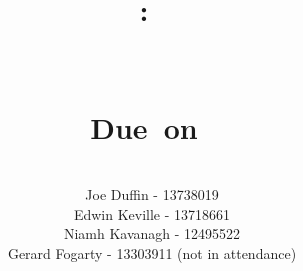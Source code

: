 \documentclass{article}
\title{
\vspace{2in}
\textmd{\textbf{\hmwkClass:\ \hmwkClassTime}}\\
\normalsize\
\vspace{0.1in}\large{\textit{\hmwkClassInstructor}}\\
\vspace{0.2in}
\textmd{\textbf{\hmwkTitle}}\\
\small{Due\ on\ \hmwkDueDate}\\
\vspace{.5in}
}
\author{\textbf{\hmwkAuthorName}\\
Joe Duffin - 13738019\\
Edwin Keville - 13718661\\
Niamh Kavanagh - 12495522\\
Gerard Fogarty - 13303911 (not in attendance)
}
\date{} %
\begin{document}
\begin{titlepage}
\maketitle
\thispagestyle{empty}
\end{titlepage}

\newpage


\newpage
\tableofcontents
\newpage

\end{document}
